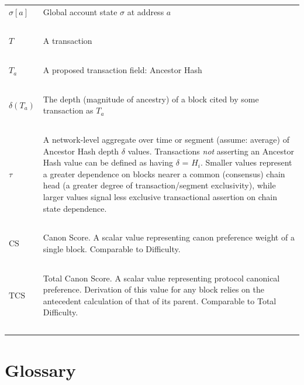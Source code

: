 \documentclass[11pt]{article}
\theoremstyle{plain}
\begin{document}
\begin{table}[H]
{\begin{tabular}{|p{5cm}|p{9cm}|}
$\sigma[a]$ & Global account state $\sigma$ at address $a$ \\~\\

$T$ & A transaction \\~\\

$T_a$ & A proposed transaction field: Ancestor Hash \\~\\

$\delta(T_a)$ & The depth (magnitude of ancestry) of a block cited by some
transaction as $T_a$ \\~\\

$\tau$ & A network-level aggregate over time or segment (assume: average) of
Ancestor Hash depth $\delta$ values. Transactions \textit{not} asserting an
Ancestor Hash value can be defined as having $\delta$ = $H_i$.
Smaller values represent a greater dependence on blocks nearer a common
(consensus) chain head (a greater degree of transaction/segment exclusivity),
while larger values signal less exclusive transactional assertion on chain
state dependence.
\\~\\

$\mathrm{CS}$ & Canon Score. A scalar value representing canon preference
weight of a single block. Comparable to Difficulty. \\~\\

$\mathrm{TCS}$ & Total Canon Score. A scalar value representing protocol
canonical preference. Derivation of this value for any block relies on the
antecedent calculation of that of its parent. Comparable to Total Difficulty.
\\~\\

\hline
\end{tabular}
}
\end{table}


\section{\normalsize{Glossary}}\label{sec: glossary}
\end{document}
